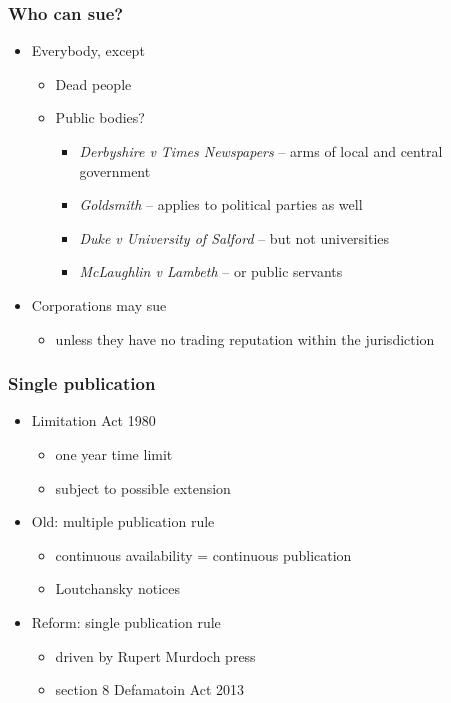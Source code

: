 \documentclass[ignorenonframetext,]{beamer}
\begin{document}
\begin{frame}
\frametitle{Who can sue?}

\begin{itemize}
\item  Everybody, except

  \begin{itemize}
  \item    Dead people
  \item    Public bodies?

    \begin{itemize}
    \item {\it Derbyshire v Times Newspapers}{ -- arms of local and central government}
    \item {\it Goldsmith}{ -- applies to political parties as well}
    \item {\it Duke v University of Salford} -- but not universities
    \item {\it McLaughlin v Lambeth} -- or public servants
    \end{itemize}
  \end{itemize}
\item  {Corporations may sue}

  \begin{itemize}
  \item unless they have no trading reputation within the
    jurisdiction
  \end{itemize}
\end{itemize}
\end{frame}

\begin{frame}
\frametitle{Single publication}

\begin{itemize}
\item  Limitation Act 1980
  \begin{itemize}
  \item  one year time limit
  \item  subject to possible extension
  \end{itemize}
\item  Old: multiple publication rule
  \begin{itemize}
  \item continuous availability = continuous publication
  \item Loutchansky notices
  \end{itemize}
\item  Reform: single publication rule
  \begin{itemize}
  \item driven by Rupert Murdoch press
  \item section 8 Defamatoin Act 2013
  \end{itemize}
\end{itemize}

\end{frame}
\end{document}
